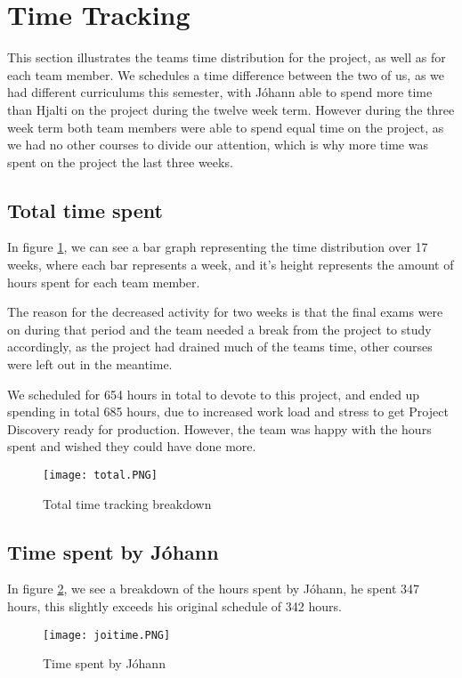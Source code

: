 \section{Time Tracking}\label{sec:timetracking}
This section illustrates the teams time distribution for the project, as well as for each team member. We schedules a time difference between the two of us, as we had different curriculums this semester, with Jóhann able to spend more time than Hjalti on the project during the twelve week term. However during the three week term both team members were able to spend equal time on the project, as we had no other courses to divide our attention, which is why more time was spent on the project the last three weeks.

\subsection{Total time spent}
In figure \ref{fig:totaltime}, we can see a bar graph representing the time distribution over 17 weeks, where each bar represents a week, and it's height represents the amount of hours spent for each team member.

The reason for the decreased activity for two weeks is that the final exams were on during that period and the team needed a break from the project to study accordingly, as the project had drained much of the teams time, other courses were left out in the meantime.

We scheduled for 654 hours in total to devote to this project, and ended up spending in total 685 hours, due to increased work load and stress to get Project Discovery ready for production. However, the team was happy with the hours spent and wished they could have done more.

\begin{figure}[H]
	\centering
	\graphicspath{ {./graphics/} }
    \centerline{\texttt{[image: total.PNG]}}
    \caption{\label{fig:totaltime}Total time tracking breakdown}
\end{figure}

\subsection{Time spent by Jóhann}
In figure \ref{fig:joitime}, we see a breakdown of the hours spent by Jóhann, he spent 347 hours, this slightly exceeds his original schedule of 342 hours.
\begin{figure}[H]
	\centering
	\graphicspath{ {./graphics/} }
    \centerline{\texttt{[image: joitime.PNG]}}
    \caption{\label{fig:joitime}Time spent by Jóhann}
\end{figure}


